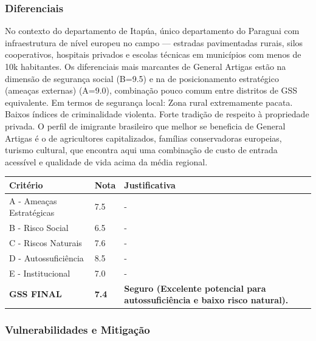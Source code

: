 \subsubsection*{Diferenciais}\label{dif-general-artigas-0712}
No contexto do departamento de Itapúa, único departamento do Paraguai com infraestrutura de nível europeu no campo — estradas pavimentadas rurais, silos cooperativos, hospitais privados e escolas técnicas em municípios com menos de 10k habitantes. Os diferenciais mais marcantes de General Artigas estão na dimensão de segurança social (B=9.5) e na de posicionamento estratégico (ameaças externas) (A=9.0), combinação pouco comum entre distritos de GSS equivalente. Em termos de segurança local: Zona rural extremamente pacata. Baixos índices de criminalidade violenta. Forte tradição de respeito à propriedade privada. O perfil de imigrante brasileiro que melhor se beneficia de General Artigas é o de agricultores capitalizados, famílias conservadoras europeias, turismo cultural, que encontra aqui uma combinação de custo de entrada acessível e qualidade de vida acima da média regional.
\label{dist:07_general_delgado}
\begin{table}[ht!]
\small \begin{tabular}{p{3.0cm}p{0.8cm}p{6.0cm}} \toprule
\textbf{Critério} & \textbf{Nota} & \textbf{Justificativa} \\ \midrule
A - Ameaças Estratégicas & 7.5 & - \\
B - Risco Social & 6.5 & - \\
C - Riscos Naturais & 7.6 & - \\
D - Autossuficiência & 8.5 & - \\
E - Institucional & 7.0 & - \\
\midrule \textbf{GSS FINAL} & \textbf{7.4} & \textbf{Seguro (Excelente potencial para autossuficiência e baixo risco natural).} \\ \bottomrule \end{tabular}
\end{table}
\subsubsection{Vulnerabilidades e
Mitigação}

